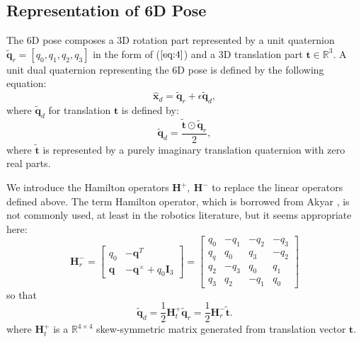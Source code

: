 \documentclass[micromachines,article,accept,pdftex,moreauthors]{Definitions/mdpi}
\begin{document}

\subsection{Representation of 6D Pose}  \label{2.4}
The 6D pose composes a 3D rotation part represented by a unit quaternion $\widetilde{\boldsymbol{q}}_r = [q_0, q_1, q_2, q_3]$ in the form of ($\ref{eq:4}$) and a 3D translation part $\boldsymbol{t} \in \mathbb{R}^3$. A unit dual quaternion representing the 6D pose is defined by the following equation:
\begin{equation} \label{eq:7}
    \widehat{\boldsymbol{x}}_{d} = 
    \widetilde{\boldsymbol{q}}_{r} + \epsilon \widetilde{\boldsymbol{q}}_{d},
\end{equation}
where $\widetilde{\boldsymbol{q}}_{d}$ for translation $\boldsymbol{t}$ is defined by:
\begin{equation} \label{eq:8}
    \widetilde{\boldsymbol{q}}_{d} = \frac{
    \widetilde{\boldsymbol{t}} \odot
    \widetilde{\boldsymbol{q}}_{r}}{2},
\end{equation}
where $\widetilde{\boldsymbol{t}}$ is represented by a purely imaginary translation quaternion with zero real parts.

We introduce the Hamilton operators $\boldsymbol{H}^{+},{\ } \boldsymbol{H}^{-}$ to replace the linear operators defined above. The term Hamilton operator, which is borrowed from Akyar \cite{akyarDualQuaternionsSpatial2008}, is not commonly used, at least in the robotics literature, but it seems appropriate here:
\begin{equation*}
    \boldsymbol{H}_{r}^{-} = 
        \left[\begin{array}{cc}
        q_{0} & -\boldsymbol{q}^{T} \\
        \boldsymbol{q} & -\boldsymbol{q}^{\times}+q_{0} \boldsymbol{I}_{3}
    \end{array}\right] =
    \begin{bmatrix}
    {q_0} &  {-q_1} &  {-q_2} &  {-q_3} \\
    {q_q} &  {q_0} & {q_3} &  {-q_2} \\
    {q_2} &  {-q_3} &  {q_0} & {q_1} \\
    {q_3} & {q_2} &  {-q_1} &  {q_0} 
    \end{bmatrix}
\end{equation*}
so that 
\begin{equation} \label{eq:9}
    \widetilde{\boldsymbol{q}}_{d} = \frac{1}{2} \boldsymbol{H}_{t}^{+}\widetilde{\boldsymbol{q}}_{r}
    = \frac{1}{2} \boldsymbol{H}_{r}^{-}\widetilde{\boldsymbol{t}}.
\end{equation}
where $\boldsymbol{H}_{t}^{+}$ is a $\mathbb{R}^{4 \times 4}$ skew-symmetric matrix generated from translation vector $\boldsymbol{t}$.
\end{document}
